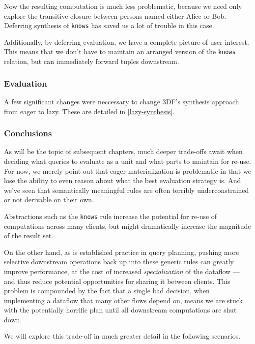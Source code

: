 \documentclass[../catalog.tex]{subfiles}
\begin{document}
Now the resulting computation is much less problematic, because we
need only explore the transitive closure between persons named either
Alice or Bob. Deferring synthesis of \texttt{knows} has saved us a lot
of trouble in this case.

Additionally, by deferring evaluation, we have a complete picture of
user interest. This means that we don't have to maintain an arranged
version of the \texttt{knows} relation, but can immediately forward
tuples downstream.

\subsubsection{Evaluation}

A few significant changes were neccessary to change 3DF's synthesis
approach from eager to lazy. These are detailed in
\ref{lazy-synthesis}.

\subsubsection{Conclusions}

As will be the topic of subsequent chapters, much deeper trade-offs
await when deciding what queries to evaluate as a unit and what parts
to maintain for re-use. For now, we merely point out that eager
materialization is problematic in that we lose the ability to even
reason about what the best evaluation strategy is. And we've seen that
semantically meaningful rules are often terribly underconstrained or
not derivable on their own.

Abstractions such as the \texttt{knows} rule increase the potential
for re-use of computations across many clients, but might dramatically
increase the magnitude of the result set.

On the other hand, as is established practice in query planning,
pushing more selective downstream operations back up into these
generic rules can greatly improve performance, at the cost of
increased \emph{specialization} of the dataflow — and thus reduce
potential opportunities for sharing it between clients. This problem
is compounded by the fact that a single bad decision, when
implementing a dataflow that many other flows depend on, means we are
stuck with the potentially horrific plan until all downstream
computations are shut down.

We will explore this trade-off in much greater detail in the following
scenarios.
\end{document}
